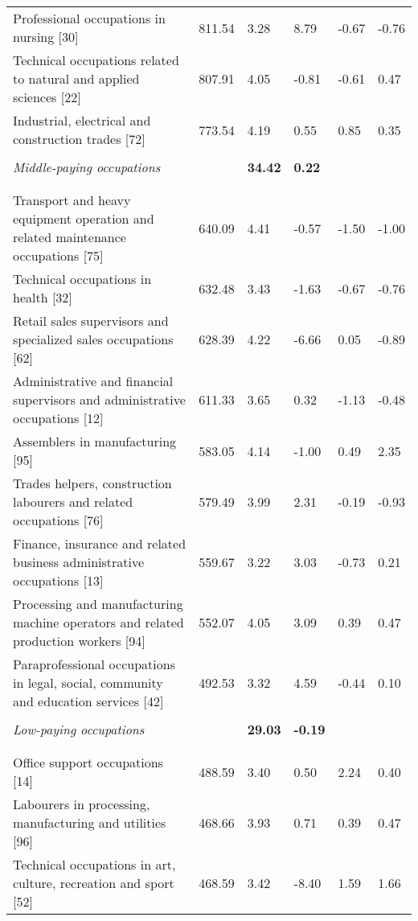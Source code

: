 \documentclass[12pt]{article}
\begin{document}
\begin{landscape}
\begin{table}[!htbp]
\begin{tabular}{p{}p{}p{}p{}p{}p{}}
Professional occupations in nursing [30]	& 811.54	& 3.28 &	8.79	& -0.67	& -0.76 \\
Technical occupations related to natural and applied sciences [22]	& 807.91	& 4.05	& -0.81	& -0.61	& 0.47 \\
Industrial, electrical and construction trades [72]	& 773.54 &	4.19	& 0.55	& 0.85	& 0.35 \\
\hline \\[-1.8ex] 
\textit{Middle-paying occupations}	& &	\textbf{34.42} &	\textbf{0.22}	 & &	 \\
\\[-1.8ex]\hline 
\hline \\[-1.8ex] 
Transport and heavy equipment operation and related maintenance occupations [75]	& 640.09	& 4.41 &	-0.57 &	-1.50	& -1.00 \\
Technical occupations in health [32]	& 632.48	& 3.43	& -1.63	& -0.67	& -0.76 \\
Retail sales supervisors and specialized sales occupations [62]	& 628.39	& 4.22	& -6.66	& 0.05	& -0.89 \\
Administrative and financial supervisors and administrative occupations [12]	& 611.33	& 3.65	& 0.32	& -1.13 &	-0.48 \\
Assemblers in manufacturing [95]	& 583.05	& 4.14	& -1.00	& 0.49	& 2.35 \\
Trades helpers, construction labourers and related occupations [76]	& 579.49	& 3.99	& 2.31	& -0.19	& -0.93 \\
Finance, insurance and related business administrative occupations [13]	& 559.67	& 3.22	& 3.03	& -0.73 &	0.21 \\
Processing and manufacturing machine operators and related production workers [94]	& 552.07	& 4.05	& 3.09 &	0.39 	& 0.47 \\
Paraprofessional occupations in legal, social, community and education services [42]	& 492.53	& 3.32	& 4.59 &	-0.44	& 0.10 \\
\hline \\[-1.8ex] 
\textit{Low-paying occupations}	& &	\textbf{29.03}	& \textbf{-0.19} & & \\
\\[-1.8ex]\hline 
\hline \\[-1.8ex] 
Office support occupations [14]	& 488.59	& 3.40 &	0.50	& 2.24	& 0.40 \\
Labourers in processing, manufacturing and utilities [96]	& 468.66	& 3.93	& 0.71	& 0.39	& 0.47 \\
Technical occupations in art, culture, recreation and sport [52]	& 468.59	& 3.42	& -8.40	& 1.59	& 1.66 \\

\end{tabular}
\end{table}
\end{landscape}
\end{document}
